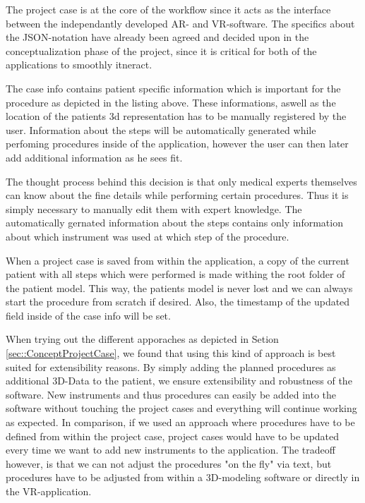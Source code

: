The project case is at the core of the workflow since it acts as the interface between the independantly developed AR- and VR-software.
The specifics about the JSON-notation have already been agreed and decided upon in the conceptualization phase of the project, since it is critical for both of the applications to smoothly itneract. 

The case info contains patient specific information which is important for the procedure as depicted in the listing above.
These informations, aswell as the location of the patients 3d representation has to be manually registered by the user.
Information about the steps will be automatically generated while perfoming procedures inside of the application, however the user can then later add additional information as he sees fit.

The thought process behind this decision is that only medical experts themselves can know about the fine details while performing certain procedures.
Thus it is simply necessary to manually edit them with expert knowledge.
The automatically gernated information about the steps contains only information about which instrument was used at which step of the procedure.

When a project case is saved from within the application, a copy of the current patient with all steps which were performed is made withing the root folder of the patient model.
This way, the patients model is never lost and we can always start the procedure from scratch if desired.
Also, the timestamp of the updated field inside of the case info will be set.

When trying out the different apporaches as depicted in Setion \ref{sec::ConceptProjectCase}, we found that using this kind of approach is best suited for extensibility reasons.
By simply adding the planned procedures as additional 3D-Data to the patient, we ensure extensibility and robustness of the software.
New instruments and thus procedures can easily be added into the software without touching the project cases and everything will continue working as expected.
In comparison, if we used an approach where procedures have to be defined from within the project case, project cases would have to be updated every time we want to add new instruments to the application.
The tradeoff however, is that we can not adjust the procedures "on the fly" via text, but procedures have to be adjusted from within a 3D-modeling software or directly in the VR-application.